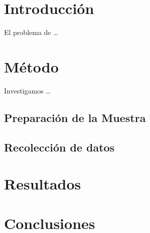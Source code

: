 \documentclass{article}
\begin{document}
\section{Introducci\'on}

El problema de \ldots

\section{M\'etodo}

Investigamos  \ldots

\subsection{Preparaci\'on de la Muestra}

\subsection{Recolecci\'on de datos}

\section{Resultados}

\section{Conclusiones}
\end{document}
